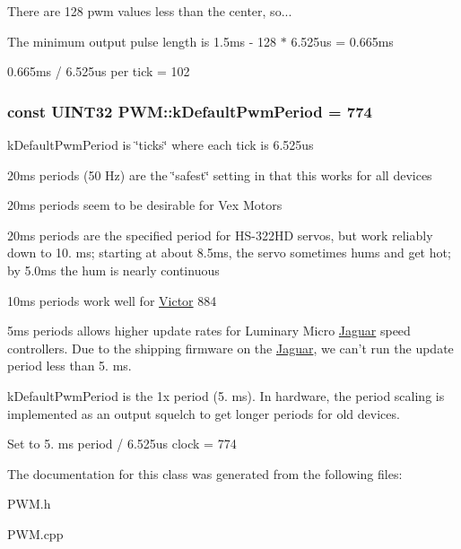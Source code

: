 \begin{DoxyItemize}
\item \-There are 128 pwm values less than the center, so...
\item \-The minimum output pulse length is 1.\-5ms -\/ 128 $\ast$ 6.\-525us = 0.\-665ms
\item 0.\-665ms / 6.\-525us per tick = 102 
\end{DoxyItemize}\hypertarget{classPWM_ad76e35266df11ca46f9792492671379a}{
\subsubsection[{k\-Default\-Pwm\-Period}]{\setlength{\rightskip}{0pt plus 5cm}const \-U\-I\-N\-T32 {\bf \-P\-W\-M\-::k\-Default\-Pwm\-Period} = 774}}\label{classPWM_ad76e35266df11ca46f9792492671379a}
k\-Default\-Pwm\-Period is \char`\"{}ticks\char`\"{} where each tick is 6.\-525us


\begin{DoxyItemize}
\item 20ms periods (50 \-Hz) are the \char`\"{}safest\char`\"{} setting in that this works for all devices
\item 20ms periods seem to be desirable for \-Vex \-Motors
\item 20ms periods are the specified period for \-H\-S-\/322\-H\-D servos, but work reliably down to 10. ms; starting at about 8.\-5ms, the servo sometimes hums and get hot; by 5.\-0ms the hum is nearly continuous
\item 10ms periods work well for \hyperlink{classVictor}{\-Victor} 884
\item 5ms periods allows higher update rates for \-Luminary \-Micro \hyperlink{classJaguar}{\-Jaguar} speed controllers. \-Due to the shipping firmware on the \hyperlink{classJaguar}{\-Jaguar}, we can't run the update period less than 5. ms.
\end{DoxyItemize}

k\-Default\-Pwm\-Period is the 1x period (5. ms). \-In hardware, the period scaling is implemented as an output squelch to get longer periods for old devices.

\-Set to 5. ms period / 6.\-525us clock = 774 

\-The documentation for this class was generated from the following files\-:\begin{DoxyCompactItemize}
\item 
\-P\-W\-M.\-h\item 
\-P\-W\-M.\-cpp\end{DoxyCompactItemize}
